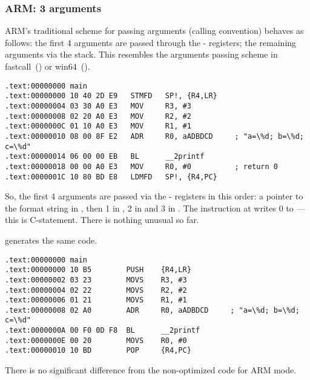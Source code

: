 \subsubsection{ARM: 3 arguments}

ARM's traditional scheme for passing arguments (calling convention) behaves as follows:
the first 4 arguments are passed through the - registers; the remaining arguments via the stack.
This resembles the arguments passing scheme in 
fastcall~() or win64~().


\mysubparagraph{\NonOptimizingKeilVI (\ARMMode)}

\begin{lstlisting}[caption=\NonOptimizingKeilVI (\ARMMode),style=customasmARM]
.text:00000000 main
.text:00000000 10 40 2D E9   STMFD   SP!, {R4,LR}
.text:00000004 03 30 A0 E3   MOV     R3, #3
.text:00000008 02 20 A0 E3   MOV     R2, #2
.text:0000000C 01 10 A0 E3   MOV     R1, #1
.text:00000010 08 00 8F E2   ADR     R0, aADBDCD     ; "a=\%d; b=\%d; c=\%d"
.text:00000014 06 00 00 EB   BL      __2printf
.text:00000018 00 00 A0 E3   MOV     R0, #0          ; return 0
.text:0000001C 10 80 BD E8   LDMFD   SP!, {R4,PC}
\end{lstlisting}

So, the first 4 arguments are passed via the - registers in this order:
a pointer to the \printf format string in 
, then 1 in , 2 in  and 3 in .
The instruction at  writes 0 to ---this is  C-statement.
There is nothing unusual so far.

\OptimizingKeilVI generates the same code.

\mysubparagraph{\OptimizingKeilVI (\ThumbMode)}

\begin{lstlisting}[caption=\OptimizingKeilVI (\ThumbMode),style=customasmARM]
.text:00000000 main
.text:00000000 10 B5        PUSH    {R4,LR}
.text:00000002 03 23        MOVS    R3, #3
.text:00000004 02 22        MOVS    R2, #2
.text:00000006 01 21        MOVS    R1, #1
.text:00000008 02 A0        ADR     R0, aADBDCD     ; "a=\%d; b=\%d; c=\%d"
.text:0000000A 00 F0 0D F8  BL      __2printf
.text:0000000E 00 20        MOVS    R0, #0
.text:00000010 10 BD        POP     {R4,PC}
\end{lstlisting}

There is no significant difference from the non-optimized code for ARM mode.

